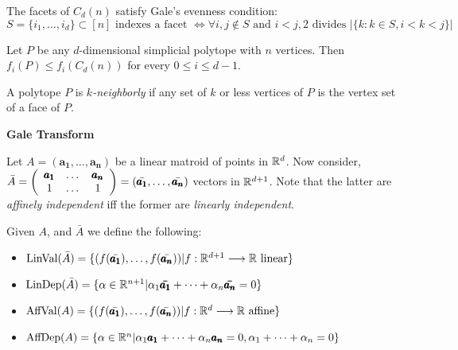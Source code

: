 \begin{obs}
    The facets of $C_d(n)$ satisfy Gale's evenness condition:
    $$ S = \lbrace i_1, \dots, i_d \rbrace \subset [n] \text{ indexes a facet } \Leftrightarrow \forall i,j \not\in S \text{ and } i < j, 2 \text{ divides } |\{k : k \in S, i < k < j\}|$$
\end{obs}

\begin{theorem}
    Let $P$ be any $d$-dimensional simplicial polytope with $n$ vertices. Then $f_i(P) \leq f_i(C_d(n))$ for every $0 \leq i \leq d-1$.
\end{theorem}

\begin{definition}[k-neighbourness]
    A polytope $P$ is \textit{$k$-neighborly} if any set of $k$ or less vertices of $P$ is the vertex set of a face of $P$.
\end{definition}

\textbf{Gale Transform}

Let $A = (\pmb{a_1}, \dots, \pmb{a_n})$ be a linear matroid of points in $\mathbb{R}^d$.
Now consider, $\bar{A} = \left( \begin{array}{c c c} \pmb{a_1} & \dots & \pmb{a_n} \\ 1 & \dots & 1 \end{array} \right) = (\bar{\pmb{a_1}}, \dots, \bar{\pmb{a_n}})$ vectors in $\mathbb{R}^{d+1}$.
Note that the latter are \textit{affinely independent} iff the former are \textit{linearly independent}.
\begin{definition}
    Given $A$, and $\bar{A}$ we define the following:
    \begin{itemize}
        \item $\text{LinVal}(\bar{A}) = \{(f(\bar{\pmb{a_1}}), \dots, f(\bar{\pmb{a_n}})) | f: \mathbb{R}^{d+1} \longrightarrow \mathbb{R} \text{ linear} \}$
        \item $\text{LinDep}(\bar{A}) = \{ \alpha \in \mathbb{R}^{n+1} | \alpha_1 \pmb{\bar{a_1}} + \dots + \alpha_n \pmb{\bar{a_n}} = 0 \}$
        \item $\text{AffVal}(A) = \{(f(\bar{\pmb{a_1}}), \dots, f(\bar{\pmb{a_n}})) | f: \mathbb{R}^{d} \longrightarrow \mathbb{R} \text{ affine} \}$
        \item $\text{AffDep}(A) = \{ \alpha \in \mathbb{R}^n | \alpha_1 \pmb{a_1} + \dots + \alpha_n \pmb{a_n} = 0, \alpha_1 + \dots + \alpha_n = 0 \}$
    \end{itemize}
\end{definition}


